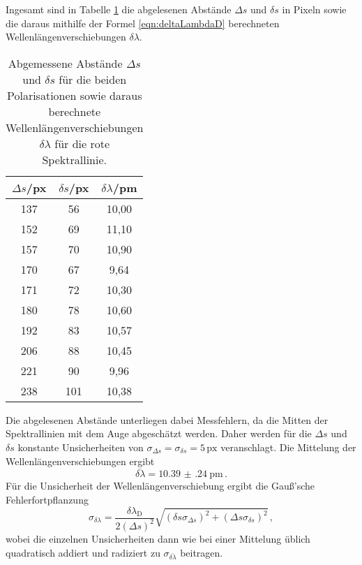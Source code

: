Ingesamt sind in Tabelle \ref{tab:rot} die abgelesenen Abstände $\Delta s$ und $\delta s$ in Pixeln sowie die daraus mithilfe der Formel \eqref{eqn:deltaLambdaD} berechneten Wellenlängenverschiebungen $\delta \lambda$.

\begin{table}[htp]
	\begin{center}
    \caption{Abgemessene Abstände $\Delta s$ und $\delta s$ für die beiden Polarisationen sowie daraus berechnete Wellenlängenverschiebungen $\delta \lambda$ für die rote Spektrallinie.}
    \label{tab:rot}
		\begin{tabular}{ccc}
		\toprule
			{$\Delta s$/px} & {$\delta s$/px} & {$\delta \lambda$/pm}\\
			\midrule
			137 &  56 & 10,00\\
			152 &  69 & 11,10\\
			157 &  70 & 10,90\\
			170 &  67 &  9,64\\
			171 &  72 & 10,30\\
			180 &  78 & 10,60\\
			192 &  83 & 10,57\\
			206 &  88 & 10,45\\
			221 &  90 &  9,96\\
			238 & 101 & 10,38\\
		\bottomrule
		\end{tabular}
	\end{center}
\end{table}

Die abgelesenen Abstände unterliegen dabei Messfehlern, da die Mitten der Spektrallinien mit dem Auge abgeschätzt werden. Daher werden für die $\Delta s$ und $\delta s$ konstante Unsicherheiten von $\sigma_{\Delta s} = \sigma_{\delta s}= 5\,\text{px}$ veranschlagt.
Die Mittelung der Wellenlängenverschiebungen ergibt
\begin{equation*}
  \overline{\delta \lambda} = \SI{10.39(24)}{\pico\meter}\,.
\end{equation*}
Für die Unsicherheit der Wellenlängenverschiebung ergibt die Gauß'sche Fehlerfortpflanzung
\begin{equation}
  \sigma_{\delta \lambda} = \frac{\delta \lambda_\text{D}}{2(\Delta s)^2} \sqrt{(\delta s \sigma_{\Delta s})^2 + (\Delta s \sigma_{\delta s})^2}\,,
\end{equation}
wobei die einzelnen Unsicherheiten dann wie bei einer Mittelung üblich quadratisch addiert und radiziert zu $\sigma_{\overline{\delta \lambda}}$ beitragen.

